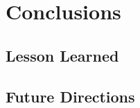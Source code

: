 
\chapter{Conclusions} %

\label{ch:conclusions} %

\section{Lesson Learned}

\section{Future Directions}
